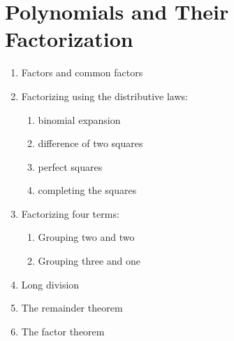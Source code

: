 
\chapter{Polynomials and Their Factorization}

\begin{enumerate}
\item Factors and common factors

\item Factorizing using the distributive laws:
  \begin{enumerate}
  \item binomial expansion

  \item difference of two squares

  \item perfect squares

  \item completing the squares
  \end{enumerate}

\item Factorizing four terms:
  \begin{enumerate}
  \item Grouping two and two

  \item Grouping three and one
  \end{enumerate}

\item Long division

\item The remainder theorem

\item The factor theorem
\end{enumerate}
